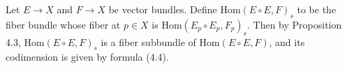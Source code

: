 Let $E \to X$ and $F \to X$ be vector bundles. Define $\text{Hom}(E \circ E, F)_s$ to be the fiber bundle whose fiber at $p \in X$ is $\text{Hom}(E_p \circ E_p, F_p)_s$. Then by Proposition 4.3, $\text{Hom}(E \circ E, F)_s$ is a fiber subbundle of $\text{Hom}(E \circ E, F)$, and its codimension is given by formula (4.4).
